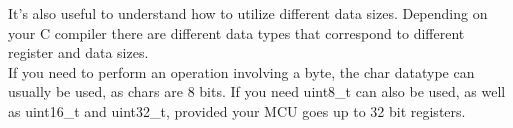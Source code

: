\documentclass[10pt]{article}
\begin{document}
It's also useful to understand how to utilize different data sizes. Depending on your C compiler there are different data types that correspond to different register and data sizes. \\

If you need to perform an operation involving a byte, the char datatype can usually be used, as chars are 8 bits. If you need uint8\_t can also be used, as well as uint16\_t and uint32\_t, provided your MCU goes up to 32 bit registers.
\end{document}
